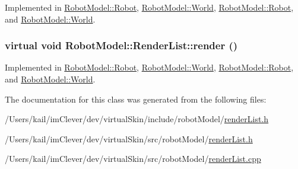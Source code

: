 Implemented in \hyperlink{class_robot_model_1_1_robot_a47e480a4cad58266d12efce34f3fb563}{RobotModel::Robot}, \hyperlink{class_robot_model_1_1_world_a150eab10c21532162bb698d72aecec16}{RobotModel::World}, \hyperlink{class_robot_model_1_1_robot_a3be7d3c8d21aeb68633d9e176a3fbf08}{RobotModel::Robot}, and \hyperlink{class_robot_model_1_1_world_a3a197c0bac0b3dbbdd73942a56168a29}{RobotModel::World}.\hypertarget{class_robot_model_1_1_render_list_ac8646765beee22bf11582049dc3cf195}{
\subsubsection[{render}]{\setlength{\rightskip}{0pt plus 5cm}virtual void RobotModel::RenderList::render ()}}
\label{class_robot_model_1_1_render_list_ac8646765beee22bf11582049dc3cf195}


Implemented in \hyperlink{class_robot_model_1_1_robot_a47e480a4cad58266d12efce34f3fb563}{RobotModel::Robot}, \hyperlink{class_robot_model_1_1_world_a150eab10c21532162bb698d72aecec16}{RobotModel::World}, \hyperlink{class_robot_model_1_1_robot_a3be7d3c8d21aeb68633d9e176a3fbf08}{RobotModel::Robot}, and \hyperlink{class_robot_model_1_1_world_a3a197c0bac0b3dbbdd73942a56168a29}{RobotModel::World}.

The documentation for this class was generated from the following files:\begin{DoxyCompactItemize}
\item 
/Users/kail/imClever/dev/virtualSkin/include/robotModel/\hyperlink{include_2robot_model_2render_list_8h}{renderList.h}\item 
/Users/kail/imClever/dev/virtualSkin/src/robotModel/\hyperlink{src_2robot_model_2render_list_8h}{renderList.h}\item 
/Users/kail/imClever/dev/virtualSkin/src/robotModel/\hyperlink{render_list_8cpp}{renderList.cpp}\end{DoxyCompactItemize}
